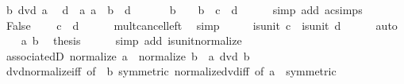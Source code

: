 \begin{isabellebody}
\ {\isacartoucheopen}b\ dvd\ a{\isacartoucheclose}\ \isamarkupfalse%
\ d\ \ a{\isacharcolon}{\kern0pt}\ {\isachardoublequoteopen}a\ {\isacharequal}{\kern0pt}\ b\ {\isacharasterisk}{\kern0pt}\ d{\isachardoublequoteclose}\ \isacommand{{\isachardot}{\kern0pt}{\isachardot}{\kern0pt}}\isamarkupfalse%
\isanewline
\ \ \isamarkupfalse%
\ \isamarkupfalse%
\ {\isachardoublequoteopen}b\ {\isacharasterisk}{\kern0pt}\ {}\ {\isacharequal}{\kern0pt}\ b\ {\isacharasterisk}{\kern0pt}\ {\isacharparenleft}{\kern0pt}c\ {\isacharasterisk}{\kern0pt}\ d{\isacharparenright}{\kern0pt}{\isachardoublequoteclose}\isanewline
\ \ \ \ \isamarkupfalse%
\ {\isacharparenleft}{\kern0pt}simp\ add{\isacharcolon}{\kern0pt}\ ac{\isacharunderscore}{\kern0pt}simps{\isacharparenright}{\kern0pt}\isanewline
\ \ \isamarkupfalse%
\ False\ \isamarkupfalse%
\ {\isachardoublequoteopen}{}\ {\isacharequal}{\kern0pt}\ c\ {\isacharasterisk}{\kern0pt}\ d{\isachardoublequoteclose}\isanewline
\ \ \ \ \isamarkupfalse%
\ mult{\isacharunderscore}{\kern0pt}cancel{\isacharunderscore}{\kern0pt}left\ \isamarkupfalse%
\ simp\isanewline
\ \ \isamarkupfalse%
\ \isamarkupfalse%
\ {\isachardoublequoteopen}is{\isacharunderscore}{\kern0pt}unit\ c{\isachardoublequoteclose}\ \ {\isachardoublequoteopen}is{\isacharunderscore}{\kern0pt}unit\ d{\isachardoublequoteclose}\isanewline
\ \ \ \ \isamarkupfalse%
\ auto\isanewline
\ \ \isamarkupfalse%
\ a\ b\ \isamarkupfalse%
\ {\isacharquery}{\kern0pt}thesis\isanewline
\ \ \ \ \isamarkupfalse%
\ {\isacharparenleft}{\kern0pt}simp\ add{\isacharcolon}{\kern0pt}\ is{\isacharunderscore}{\kern0pt}unit{\isacharunderscore}{\kern0pt}normalize{\isacharparenright}{\kern0pt}\isanewline
{}\isamarkupfalse%
%
\endisatagproof
{\isafoldproof}%
%
\isadelimproof
\isanewline
%
\endisadelimproof
\isanewline
{}\isamarkupfalse%
\ associatedD{}{\isacharcolon}{\kern0pt}\ {\isachardoublequoteopen}normalize\ a\ {\isacharequal}{\kern0pt}\ normalize\ b\ {\isasymLongrightarrow}\ a\ dvd\ b{\isachardoublequoteclose}\isanewline
%
\isadelimproof
\ \ %
\endisadelimproof
%
\isatagproof
{}\isamarkupfalse%
\ dvd{\isacharunderscore}{\kern0pt}normalize{\isacharunderscore}{\kern0pt}iff\ {\isacharbrackleft}{\kern0pt}of\ {\isacharunderscore}{\kern0pt}\ b{\isacharcomma}{\kern0pt}\ symmetric{\isacharbrackright}{\kern0pt}\ normalize{\isacharunderscore}{\kern0pt}dvd{\isacharunderscore}{\kern0pt}iff\ {\isacharbrackleft}{\kern0pt}of\ a\ {\isacharunderscore}{\kern0pt}{\isacharcomma}{\kern0pt}\ symmetric{\isacharbrackright}{\kern0pt}\isanewline

\end{isabellebody}
